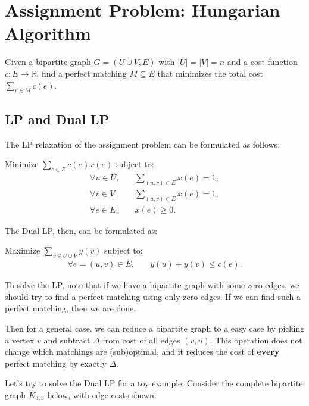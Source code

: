\chapter{Assignment Problem: Hungarian Algorithm}

\begin{problem}
Given a bipartite graph \( G = (U\cup V, E) \) with \( |U| = |V| = n \) and a cost function \( c: E \to \mathbb{R} \), find a perfect matching \( M \subseteq E \) that minimizes the total cost \( \sum_{e \in M} c(e) \).
\end{problem}

\section{LP and Dual LP}

The LP relaxation of the assignment problem can be formulated as follows:

\begin{problem}
Minimize \( \sum_{e \in E} c(e) x(e) \) subject to:
\begin{align*}
	\forall u \in U, \quad & \sum_{(u,v)\in E} x(e) = 1, \\
	\forall v \in V, \quad & \sum_{(u,v)\in E} x(e) = 1, \\
	\forall e \in E, \quad & x(e) \geq 0.
\end{align*}
\end{problem}

The Dual LP, then, can be formulated as:

\begin{problem}
Maximize \( \sum_{v \in U\cup V} y(v) \) subject to:
\begin{align*}
	\forall e = (u,v) \in E, \quad & y(u) + y(v) \leq c(e).
\end{align*}
\end{problem}

To solve the LP, note that if we have a bipartite graph with some zero edges, we should try to find a perfect matching using only zero edges. If we can find such a perfect matching, then we are done.

Then for a general case, we can reduce a bipartite graph to a easy case by picking a vertex $v$ and subtract $\Delta$ from cost of all edges $(v,u)$.
This operation does not change which matchings are (sub)optimal, and it reduces the cost of \textbf{every} perfect matching by exactly $\Delta$.

Let's try to solve the Dual LP for a toy example:
Consider the complete bipartite graph \( K_{3,3} \) below, with edge costs shown:

